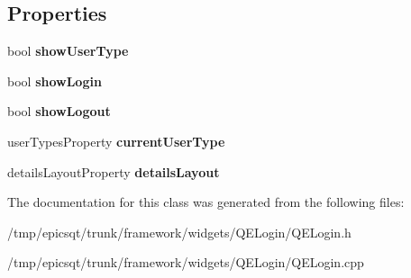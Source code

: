 \subsection*{Properties}
\begin{DoxyCompactItemize}
\item 
\hypertarget{classQELogin_a3b0cf0d664303b8e5518a794e519f9a1}{
bool {\bfseries showUserType}}
\label{classQELogin_a3b0cf0d664303b8e5518a794e519f9a1}

\item 
\hypertarget{classQELogin_a68b5126a1330359a1f1980750bfcbf2a}{
bool {\bfseries showLogin}}
\label{classQELogin_a68b5126a1330359a1f1980750bfcbf2a}

\item 
\hypertarget{classQELogin_a35af360423e3838aafeee71e6ec4e7b9}{
bool {\bfseries showLogout}}
\label{classQELogin_a35af360423e3838aafeee71e6ec4e7b9}

\item 
\hypertarget{classQELogin_a73ee001353e9f44af0926f55b59238c3}{
userTypesProperty {\bfseries currentUserType}}
\label{classQELogin_a73ee001353e9f44af0926f55b59238c3}

\item 
\hypertarget{classQELogin_a0af80091c57cba7f3673c8175b9224a5}{
detailsLayoutProperty {\bfseries detailsLayout}}
\label{classQELogin_a0af80091c57cba7f3673c8175b9224a5}

\end{DoxyCompactItemize}


The documentation for this class was generated from the following files:\begin{DoxyCompactItemize}
\item 
/tmp/epicsqt/trunk/framework/widgets/QELogin/QELogin.h\item 
/tmp/epicsqt/trunk/framework/widgets/QELogin/QELogin.cpp\end{DoxyCompactItemize}
